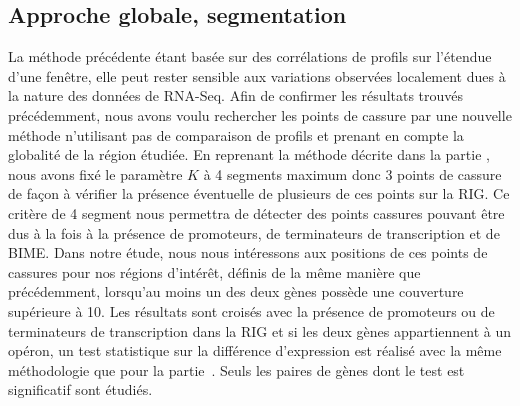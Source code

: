 \documentclass[12pt,a4paper]{report}
\begin{document}
\begin{onehalfspace}
\section*{Approche globale, segmentation}
La méthode précédente étant basée sur des corrélations de profils sur l'étendue d'une fenêtre, elle peut rester sensible aux variations observées localement dues à la nature des données de RNA-Seq. Afin de confirmer les résultats trouvés précédemment, nous avons voulu rechercher les points de cassure par une nouvelle méthode n'utilisant pas de comparaison de profils et prenant en compte la globalité de la région étudiée.
En reprenant la méthode décrite dans la partie , nous avons fixé le paramètre $K$ à 4 segments maximum donc 3 points de cassure de façon à vérifier la présence éventuelle de plusieurs de ces points sur la RIG. Ce critère de 4 segment nous permettra de détecter des points cassures pouvant être dus à la fois à la présence de promoteurs, de terminateurs de transcription et de BIME. 
Dans notre étude, nous nous intéressons aux positions de ces points de cassures pour nos régions d'intérêt, définis de la même manière que précédemment, lorsqu'au moins un des deux gènes possède une couverture supérieure à 10. Les résultats sont croisés avec la présence de promoteurs ou de terminateurs de transcription dans la RIG et si les deux gènes appartiennent à un opéron, un test  statistique sur la différence d'expression est réalisé avec la même méthodologie que pour la partie~. Seuls les paires de gènes dont le test est significatif sont étudiés.


\end{onehalfspace}
\end{document}
